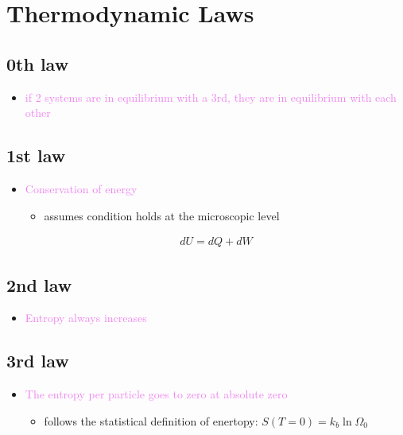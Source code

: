

\section{Thermodynamic Laws}

\subsection*{0th law}
\begin{itemize}
	\item \textcolor{violet}{if 2 systems are in equilibrium with a 3rd, they are in equilibrium
		      with each other}
\end{itemize}


\subsection*{1st law}
\begin{itemize}
	\item \textcolor{violet}{Conservation of energy}
	      \begin{itemize}
		      \item assumes condition holds at the microscopic level
	      \end{itemize}
	      \begin{align}
		      dU = dQ + dW
	      \end{align}
\end{itemize}


\subsection*{2nd law}
\begin{itemize}
	\item \textcolor{violet}{Entropy always increases}
\end{itemize}


\subsection*{3rd law}
\begin{itemize}
	\item \textcolor{violet}{The entropy per particle goes to zero at absolute zero}
	      \begin{itemize}
		      \item follows the statistical definition of enertopy: $S(T = 0) = k_b \ln \Omega_0$
	      \end{itemize}
\end{itemize}
